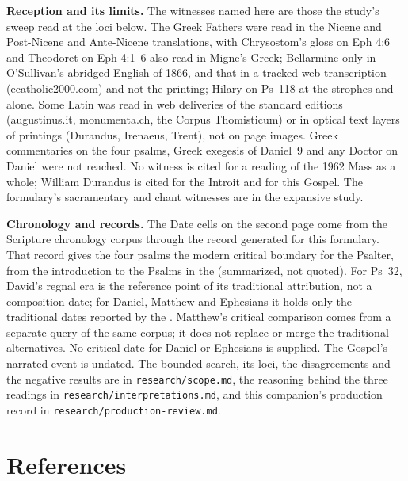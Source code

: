 {\textbf{Reception and its limits.} The witnesses named here are those the
study's sweep read at the loci below. The Greek Fathers were read
in the Nicene and Post-Nicene and Ante-Nicene translations, with Chrysostom's
gloss on Eph 4:6 and Theodoret on Eph 4:1--6 also read in Migne's Greek;
Bellarmine only in O'Sullivan's abridged English of 1866, and that in a tracked
web transcription (ecatholic2000.com) and not the printing; Hilary on Ps~118 at
the strophes  and  alone. Some Latin was read in web
deliveries of the standard editions (augustinus.it, monumenta.ch, the Corpus
Thomisticum) or in optical text layers of printings (Durandus,
Irenaeus, Trent), not on page images. Greek commentaries on the four
psalms, Greek exegesis of Daniel~9 and any Doctor on Daniel were not reached.
No witness is cited for a reading of the 1962 Mass as a whole; William
Durandus is cited for the Introit and for this Gospel. The formulary's
sacramentary and chant witnesses are in the expansive study.

\textbf{Chronology and records.} The Date cells on the second page come from
the Scripture chronology corpus through the record generated for this formulary.
That record gives the four psalms the modern critical boundary for the
Psalter, from the introduction to the Psalms in the  (summarized, not quoted). For Ps~32, David's regnal
era is the reference point of its traditional attribution, not a composition
date; for Daniel, Matthew and Ephesians it holds only the
traditional dates reported by the . Matthew's
critical comparison comes from a separate query of the same corpus; it does
not replace or merge the traditional alternatives. No critical date for
Daniel or Ephesians is supplied. The Gospel's narrated event
is undated. The bounded search, its loci, the disagreements and the negative
results are in \texttt{research/scope.md}, the reasoning behind the three
readings in \texttt{research/interpretations.md}, and this companion's
production record in \texttt{research/production-review.md}.
\par}

\section*{References}

